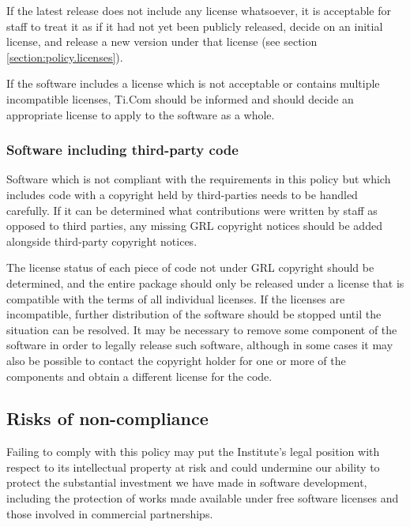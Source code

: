\documentclass[10pt,a4paper]{article}
\begin{document}
\par If the latest release does not include any license whatsoever, it is 
acceptable for staff to treat it as if it had not yet been publicly released, decide 
on an initial license, and release a new version under that license 
(see section \ref{section:policy.licenses}). 

\par If the software includes a license which is not acceptable or contains 
multiple incompatible licenses, Ti.Com should be informed and should decide an 
appropriate license to apply to the software as a whole. 

\subsubsection{Software including third-party code}
\label{section:impnotes.oldcode.thirdparty}

\par Software which is not compliant with the requirements in this policy but 
which includes code with a copyright held by third-parties needs to be handled 
carefully. If it can be determined what contributions were written by staff as 
opposed to third parties, any missing GRL copyright notices should be added 
alongside third-party copyright notices. 

\par The license status of each piece of code not under GRL copyright should 
be determined, and the entire package should only be released under a license 
that is compatible with the terms of all individual licenses. If the licenses are 
incompatible, further distribution of the software should be stopped until the 
situation can be resolved. It may be necessary to remove some component of 
the software in order to legally release such software, although in some cases 
it may also be possible to contact the copyright holder for one or more of the 
components and obtain a different license for the code. 



\subsection{Risks of non-compliance}
\label{section:policy.copyright.risks}
\par Failing to comply with this policy may put the Institute's legal position with 
respect to its intellectual property at risk and could undermine our ability to protect 
the substantial investment we have made in software development, including 
the protection of works made available under free software licenses and those 
involved in commercial partnerships. 
\end{document}

